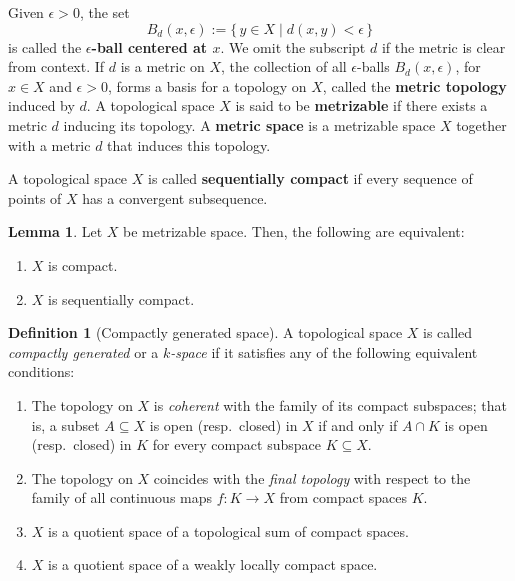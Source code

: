 \documentclass[10pt,a4paper]{article}
\theoremstyle{definition}
\newtheorem{definition}[theorem]{Definition}
\newtheorem{lemma}[theorem]{Lemma}
\begin{document}
Given $\epsilon > 0$, the set
\[
B_d(x,\epsilon) := \{\, y \in X \mid d(x,y) < \epsilon \,\}
\]
is called the \textbf{$\epsilon$-ball centered at $x$}. We omit the subscript
$d$ if the metric is clear from context. If $d$ is a metric on $X$, the
collection of all $\epsilon$-balls $B_d(x,\epsilon)$, for $x \in X$ and
$\epsilon > 0$, forms a basis for a topology on $X$, called the
\textbf{metric topology} induced by $d$. A topological space $X$ is said to be
\textbf{metrizable} if there exists a metric $d$ inducing its topology.
A \textbf{metric space} is a metrizable space $X$ together with a metric $d$
that induces this topology.



A topological space $X$ is called \textbf{sequentially compact} if every sequence of points of $X$ has a convergent subsequence.

\begin{lemma}\cite[Theorem 28.2]{Munkres2000Topology}
    Let $X$ be metrizable space. Then, the following are equivalent:
    \begin{enumerate}[label=(\roman*)]
        \item $X$ is compact.
        \item $X$ is sequentially compact.
    \end{enumerate}
\end{lemma}

\begin{definition}[Compactly generated space]
A topological space $X$ is called \emph{compactly generated} or a 
\emph{$k$-space} if it satisfies any of the following equivalent conditions:\cite{lawson1974quotients, Munkres2000Topology, willard2012general}
\begin{enumerate}
    \item The topology on $X$ is \emph{coherent} with the family of its compact
    subspaces; that is, a subset $A \subseteq X$ is open (resp.\ closed) in $X$
    if and only if $A \cap K$ is open (resp.\ closed) in $K$ for every compact
    subspace $K \subseteq X$.
    
    \item The topology on $X$ coincides with the \emph{final topology} with
    respect to the family of all continuous maps $f \colon K \to X$
    from compact spaces $K$.
    
    \item $X$ is a quotient space of a topological sum of compact spaces.
    
    \item $X$ is a quotient space of a weakly locally compact space.
\end{enumerate}
\end{definition}
\end{document}
